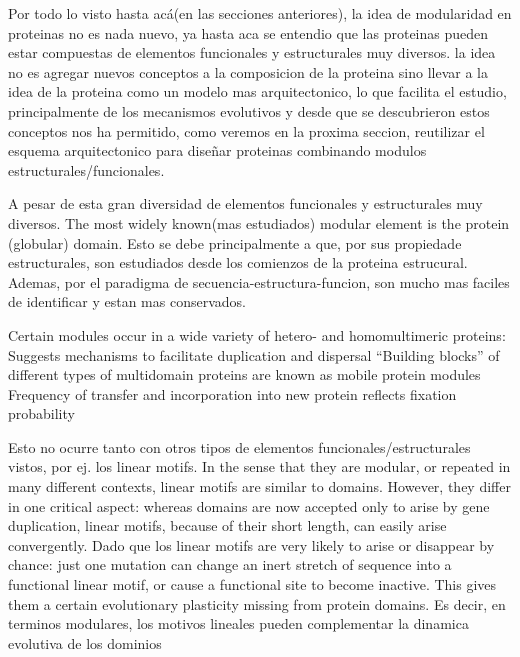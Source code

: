 Por todo lo visto hasta acá(en las secciones anteriores), la idea de modularidad en proteinas no es nada nuevo, ya hasta aca se entendio que las proteinas pueden estar compuestas de elementos funcionales y estructurales muy diversos.
la idea no es agregar nuevos conceptos a la composicion de la proteina sino llevar a la idea de la proteina como un modelo mas arquitectonico, lo que facilita el estudio, principalmente de los mecanismos evolutivos y desde que se descubrieron 
estos conceptos nos ha permitido, como veremos en la proxima seccion, reutilizar el esquema arquitectonico para diseñar proteinas combinando modulos estructurales/funcionales.


A pesar de esta gran diversidad de elementos funcionales y estructurales muy diversos.
The most widely known(mas estudiados) modular element is the protein (globular) domain. 
Esto se debe principalmente a que, por sus propiedade estructurales, son estudiados desde los comienzos de la proteina estrucural.
Ademas, por el paradigma de secuencia-estructura-funcion, son mucho mas faciles de identificar y estan mas conservados.


Certain modules occur in a wide variety of hetero- and homomultimeric proteins:
Suggests mechanisms to facilitate duplication and dispersal
“Building blocks” of different types of multidomain proteins are known as mobile protein modules
Frequency of transfer and incorporation into new protein reflects fixation probability

Esto no ocurre tanto con otros tipos de elementos funcionales/estructurales vistos, por ej. los linear motifs.
In the sense that they are modular, or repeated in many different contexts, linear motifs are similar to domains. 
However, they differ in one critical aspect: whereas domains are now accepted only to arise by gene duplication, linear motifs, because of their short length, can easily arise convergently.
Dado que los linear motifs are very likely to arise or disappear by chance: 
just one mutation can change an inert stretch of sequence into a functional linear motif, or cause a functional site to become inactive. 
This gives them a certain evolutionary plasticity missing from protein domains.
Es decir, en terminos modulares, los motivos lineales pueden complementar la dinamica evolutiva de los dominios

